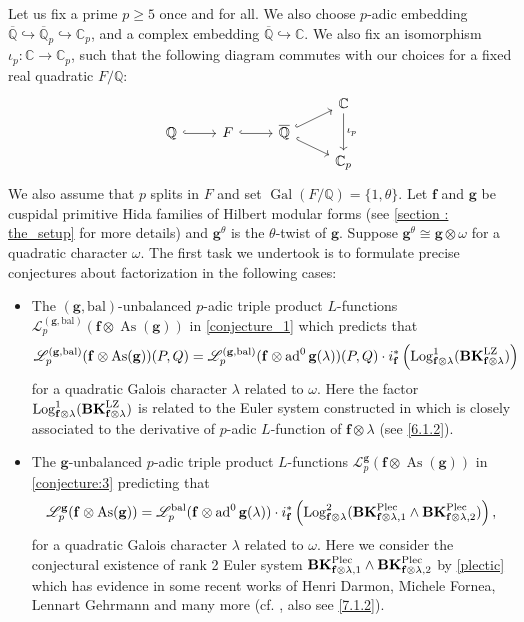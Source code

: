 \documentclass[10pt]{amsart}
\numberwithin{equation}{section}
\theoremstyle{definition}
\theoremstyle{remark} %
\newcommand{\bb}{\mathbb}
\newcommand{\scr}{\mathscr}
\newcommand{\ad}{\operatorname{ad}}
\newcommand{\As}{\operatorname{As}}
\newcommand{\Gal}{\operatorname{Gal}}
\newcommand{\Log}{\operatorname{Log}}
\renewcommand{\b}{\mathrm{bal}}
\newcommand{\f}{\mathbf{f}}
\newcommand{\g}{\mathbf{g}}
\newcommand{\Q}{\mathbb{Q}}
\begin{document}
	Let us fix a prime $ p \ge 5 $ once and for all. We also choose $p$-adic embedding $ \overline{\Q} \hookrightarrow \overline{\Q}_p \hookrightarrow \bb{C}_p$, and a complex embedding $ \overline{\Q} \hookrightarrow \mathbb{C}$. We also fix an isomorphism $\iota_p \colon \bb{C} \rightarrow \bb{C}_p$, such that the following diagram commutes with our choices for a fixed real quadratic $ F/\Q $:
	\begin{equation*}
		\begin{tikzcd}[row sep=tiny]
			&&& \bb{C} \arrow[dd, "\iota_p"] \\
			\Q \arrow[r, hookrightarrow] &F \arrow[r, hookrightarrow]  &\overline{\Q} \arrow[ur, hookrightarrow] \arrow[dr, hookrightarrow] & \\
			&&& \bb{C}_p 
		\end{tikzcd} 
	\end{equation*}	
	We also assume that $ p $ splits in $ F $ and set $ \Gal(F/\Q) = \{1,\theta\} $. Let $ \f $ and $ \g $ be cuspidal primitive Hida families of Hilbert modular forms (see \cref{section : the_setup} for more details) and $ \g^\theta $ is the $ \theta $-twist of $ \g $. Suppose $ \g^\theta \cong \g \otimes \omega $ for a quadratic character $ \omega $. The first task we undertook is to formulate precise conjectures about factorization in the following cases: 
	\begin{itemize}
		\item[\textbf{(1,1)}] The $ (\g,\b)  $-unbalanced $ p $-adic triple product $ L $-functions $ \scr{L}_p^{(\g,\b)}(\f \otimes \As(\g) ) $ in \cref{conjecture_1} which predicts that 
		\begin{equation*}
			\scr{L}_p^{(\g,\b)}(\f \otimes \As(\g) )(P,Q)  = \scr{L}_p^{(\g,\b)}(\f \otimes \ad^0{\g}(\lambda) )(P,Q)\cdot i^*_\f\left(\Log_{\f \otimes \lambda}^1(\mathbf{BK}_{\f\otimes \lambda}^{\rm LZ}) \right)
		\end{equation*} 
		for a quadratic Galois character $ \lambda $ related to $ \omega $. Here the factor $ \Log_{\f \otimes \lambda}^1(\mathbf{BK}_{\f\otimes \lambda}^{\rm LZ}) $ is related to the Euler system constructed in \cite{loeffler2020iwasawatheoryquadratichilbert} which is closely associated to the derivative of $ p $-adic $ L $-function of $ \f \otimes \lambda $ (see \textsection \ref{6.1.2}).
		\item[\textbf{(0,2)}] The $ \g  $-unbalanced $ p $-adic triple product $ L $-functions $ \scr{L}_p^{\g}(\f \otimes \As(\g) ) $ in \cref{conjecture:3} predicting that
		\[	\scr{L}_p^{\g}(\f \otimes \As(\g) )  = \scr{L}_p^{\b}(\f \otimes \ad^0{\g}(\lambda) )\cdot i^*_\f\left(\Log^2_{\f \otimes \lambda}(\mathbf{BK}^{\rm Plec}_{\f\otimes \lambda,1} \wedge \mathbf{BK}^{\rm Plec}_{\f\otimes \lambda,2} )\right), \]
		for a quadratic Galois character $ \lambda $ related to $ \omega $. Here we consider the conjectural existence of rank 2 Euler system $ \mathbf{BK}^{\rm Plec}_{\f\otimes \lambda,1} \wedge \mathbf{BK}^{\rm Plec}_{\f\otimes \lambda,2} $ by \ref{plectic} which has evidence in some recent works of Henri Darmon, Michele Fornea, Lennart Gehrmann and many more (cf. \cite{fornea23plectic, Darmon_Fornea_2025}, also see \textsection \ref{7.1.2}).   
	\end{itemize}
\end{document}
